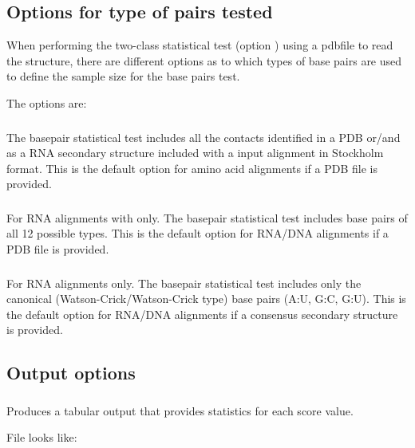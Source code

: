 \subsection{Options for type of pairs tested}

When performing the two-class statistical test (option )
using a pdbfile to read the structure, there are different options as
to which types of base pairs are used to define the sample size for the
base pairs test.

The options are:

\subsubsection{}
The basepair statistical test includes all the contacts identified in a PDB
or/and as a RNA secondary structure included with a input alignment in
Stockholm format.  This is the default option for amino acid
alignments if a PDB file is provided.  

\subsubsection{} For RNA alignments with only.
The basepair statistical test includes base pairs of all 12 possible types.
This is the default option for RNA/DNA alignments if a PDB file is
provided.  

\subsubsection{} For RNA alignments only.
The basepair statistical test includes only the canonical
(Watson-Crick/Watson-Crick type) base pairs (A:U, G:C, G:U).  This is
the default option for RNA/DNA alignments if a consensus secondary
structure is provided. 

\subsection{Output options}

\subsubsection{}

Produces a tabular output that provides statistics for each score value.

File  looks like:

